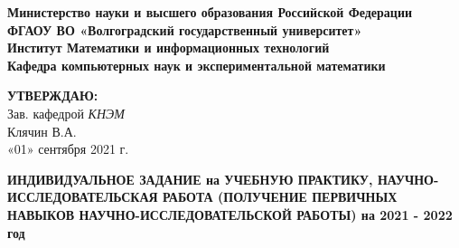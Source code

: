 \documentclass[12pt,a4paper]{scrartcl}
\begin{document}
	\phantom{fake text for spacing}
	\begin{center}
		\textbf{Министерство науки и высшего образования Российской Федерации} \\
		\textbf{ФГАОУ ВО «Волгоградский государственный университет»} \\
		\textbf{Институт Математики и информационных технологий} \\
		\textbf{Кафедра компьютерных наук и экспериментальной математики} \\
		
		\vspace{0.6cm}
		
		\hfill\begin{minipage}{0.4\textwidth}
		\begin{flushright}
			\textbf{\textsc{УТВЕРЖДАЮ:}} \\
			Зав. кафедрой \textit{КНЭМ} \\
			Клячин В.А.\\
			«01» сентября 2021 г.
		\end{flushright}
		\end{minipage}
		
		\vspace{0.6cm}
		
		\textbf{
			ИНДИВИДУАЛЬНОЕ ЗАДАНИЕ на УЧЕБНУЮ ПРАКТИКУ, НАУЧНО-ИССЛЕДОВАТЕЛЬСКАЯ РАБОТА (ПОЛУЧЕНИЕ ПЕРВИЧНЫХ НАВЫКОВ НАУЧНО-ИССЛЕДОВАТЕЛЬСКОЙ РАБОТЫ)
			на 2021 - 2022 год
			\vspace{0.2cm}
		}
		
		\vspace{0.3cm}
		\renewcommand{\arraystretch}{1.5} %
		

\end{center}
\end{document}
